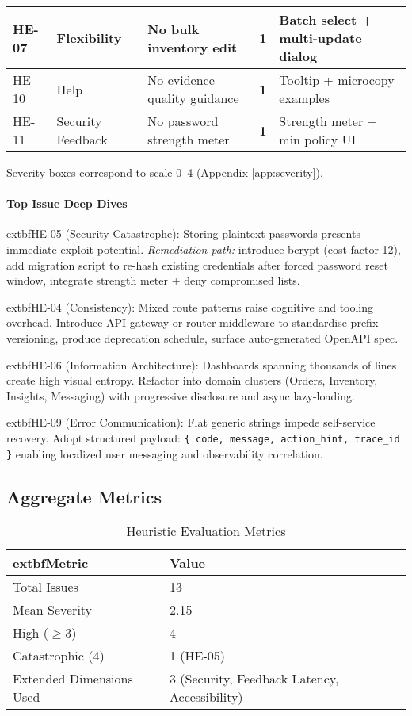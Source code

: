 \documentclass[11pt,a4paper]{article}
\newcommand{\sevbox}[1]{\begingroup\setlength{\fboxsep}{3pt}\colorbox{Sev#1}{\textbf{#1}}\endgroup}
\begin{document}
\begin{table}[h]
\begin{tabular}{|p{1.1cm}|p{2.5cm}|p{5.2cm}|p{1.1cm}|p{5.2cm}|}
		\hline
		HE-07 & Flexibility & No bulk inventory edit & \sevbox{1} & Batch select + multi-update dialog \\
		\hline
		HE-10 & Help & No evidence quality guidance & \sevbox{1} & Tooltip + microcopy examples \\
		\hline
		HE-11 & Security Feedback & No password strength meter & \sevbox{1} & Strength meter + min policy UI \\
		\hline
	\end{tabular}
	\vspace{3pt}\footnotesize Severity boxes correspond to scale 0--4 (Appendix \ref{app:severity}).
\end{table}

\paragraph{Top Issue Deep Dives}
	extbf{HE-05 (Security Catastrophe):} Storing plaintext passwords presents immediate exploit potential. \emph{Remediation path:} introduce bcrypt (cost factor 12), add migration script to re-hash existing credentials after forced password reset window, integrate strength meter + deny compromised lists.

	extbf{HE-04 (Consistency):} Mixed route patterns raise cognitive and tooling overhead. Introduce API gateway or router middleware to standardise prefix versioning, produce deprecation schedule, surface auto-generated OpenAPI spec.

	extbf{HE-06 (Information Architecture):} Dashboards spanning thousands of lines create high visual entropy. Refactor into domain clusters (Orders, Inventory, Insights, Messaging) with progressive disclosure and async lazy-loading.

	extbf{HE-09 (Error Communication):} Flat generic strings impede self-service recovery. Adopt structured payload: \verb|{ code, message, action_hint, trace_id }| enabling localized user messaging and observability correlation.

\subsection{Aggregate Metrics}
\begin{table}[h]
	\centering
	\caption{Heuristic Evaluation Metrics}\label{tab:he-metrics}
	\begin{tabular}{|p{5.2cm}|p{5.2cm}|}
		\hline
			extbf{Metric} & \textbf{Value} \\
		\hline
		Total Issues & 13 \\
		\hline
		Mean Severity & 2.15 \\
		\hline
		High ($\ge 3$) & 4 \\
		\hline
		Catastrophic (4) & 1 (HE-05) \\
		\hline
		Extended Dimensions Used & 3 (Security, Feedback Latency, Accessibility) \\
		\hline
	\end{tabular}
\end{table}
\end{document}
